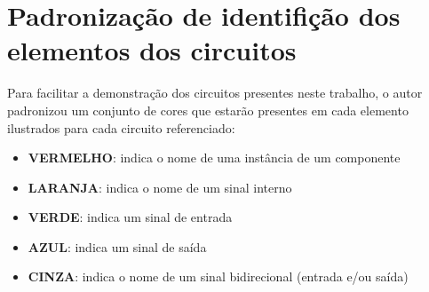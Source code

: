 \section{Padroniza{\c c}\~ao de identifi{\c c}\~ao dos elementos dos circuitos}
\label{section:padrao_sinais}

Para facilitar a demonstra{\c c}\~ao dos circuitos presentes neste trabalho, o autor padronizou um conjunto de cores que estar\~ao presentes em cada elemento ilustrados para cada circuito referenciado:

\begin{itemize}
    \item \textbf{\color{red}VERMELHO}: indica o nome de uma inst\^ancia de um componente
    \item \textbf{\color{orange}LARANJA}: indica o nome de um sinal interno
    \item \textbf{\color{green}VERDE}: indica um sinal de entrada
    \item \textbf{\color{blue}AZUL}: indica um sinal de sa\'ida
    \item \textbf{\color{gray}CINZA}: indica o nome de um sinal bidirecional (entrada e/ou sa\'ida)
\end{itemize}